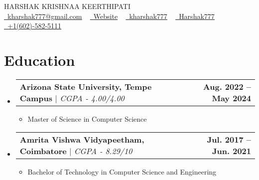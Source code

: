 \documentclass[letterpaper,11pt]{article}
\makeatletter
\newcommand{\resumeItem}[1]{
  \item\small{
    {#1 \vspace{-2pt}}
  }
}
\newcommand{\resumeEducationHeading}[2]{
    \item\vspace{-4pt}
    \begin{tabular*}{1.001\textwidth}{l@{\extracolsep{\fill}}r}
      \small#1 & \textbf{\small #2}\\
    \end{tabular*}\vspace{-7pt}
}
\newcommand{\resumeSubHeadingListStart}{\begin{itemize}[leftmargin=0.0in, label={}]}
\newcommand{\resumeSubHeadingListEnd}{\end{itemize}}
\newcommand{\resumeItemListStart}{\begin{itemize}}
\newcommand{\resumeItemListEndESpace}{\end{itemize}\vspace{-8pt}}
\newcommand{\resumeItemListEndLessSpace}{\end{itemize}\vspace{-20pt}}
\makeatother
\begin{document}


\begin{center}
  {\Huge \scshape HARSHAK KRISHNAA KEERTHIPATI} \\ \vspace{3pt}
  \href{mailto:kharshak777@gmail.com}{\raisebox{-0.2\height}\faEnvelope\  \underline{kharshak777@gmail.com}} ~ 
  \href{https://harshak.vercel.app}{\raisebox{-0.2\height}\faUser\ \underline{Website}} ~
  \href{https://linkedin.com/in/kharshak777/}{\raisebox{-0.2\height}\faLinkedin\ \underline{kharshak777}}  ~
  \href{https://github.com/Harshak777}{\raisebox{-0.2\height}\faGithub\ \underline{Harshak777}} ~
  \href{tel:+1(602)-582-5111}{\raisebox{-0.3\height}\faPhone\ \underline{+1(602)-582-5111}} ~
  \vspace{-8pt}
\end{center}

\section{Education}
  \resumeSubHeadingListStart
    \resumeEducationHeading
          {\textbf{Arizona State University, Tempe Campus} $|$ \emph{CGPA - 4.00/4.00}}{Aug. 2022 -- May 2024}
          \resumeItemListStart
            \resumeItem{Master of Science in Computer Science}
          \resumeItemListEndLessSpace
    \resumeEducationHeading
          {\textbf{Amrita Vishwa Vidyapeetham, Coimbatore} $|$ \emph{CGPA - 8.29/10}}{Jul. 2017 -- Jun. 2021}
          \resumeItemListStart
            \resumeItem{Bachelor of Technology in Computer Science and Engineering}
          \resumeItemListEndESpace
  \resumeSubHeadingListEnd
\end{document}
